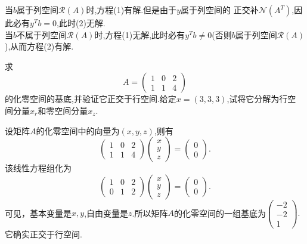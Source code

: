 ﻿\documentclass{book} \usepackage{exsheets} \usepackage{xeCJK}
\begin{document}
\begin{solution}
  当$b$属于列空间$\mathcal{R}(A)$时,方程(1)有解.但是由于$y$属于列空间的
  正交补$\mathcal{N}(A^T)$,因此必有$y^Tb=0$,此时(2)无解.\\

  当$b$不属于列空间$\mathcal{R}(A)$时,方程(1)无解,此时必有$y^Tb\neq
  0$(否则$b$属于列空间$\mathcal{R}(A)$),从而方程(2)有解.
\end{solution}
\begin{question}
  求
$$
A=
\begin{pmatrix}
  1&0&2\\
  1&1&4
\end{pmatrix}
$$
的化零空间的基底,并验证它正交于行空间.给定$x=(3,3,3)$,试将它分解为行空
间分量$x_{r}$和零空间分量$x_{z}$.
\end{question}
\begin{solution}
  设矩阵$A$的化零空间中的向量为$(x,y,z)$,则有
$$
\begin{pmatrix}
  1&0&2\\
  1&1&4
\end{pmatrix}
\begin{pmatrix}
  x\\
  y\\
  z
\end{pmatrix}=
\begin{pmatrix}
  0\\
  0
\end{pmatrix}.
$$
该线性方程组化为
$$
\begin{pmatrix}
  1&0&2\\
  0&1&2
\end{pmatrix}
\begin{pmatrix}
  x\\
  y\\
  z
\end{pmatrix}=
\begin{pmatrix}
  0\\
  0
\end{pmatrix}.
$$
可见，基本变量是$x,y$,自由变量是$z$.所以矩阵$A$的化零空间的一组基底为$
\begin{pmatrix}
  -2\\
  -2\\
  1
\end{pmatrix}.
$它确实正交于行空间.\\


\end{solution}
\end{document}
